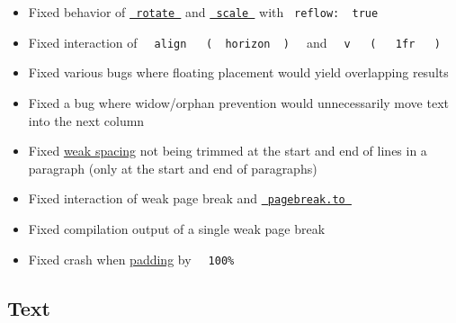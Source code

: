 \begin{itemize}
\item
  Fixed behavior of
  \href{/docs/reference/layout/rotate/}{\texttt{\ rotate\ }} and
  \href{/docs/reference/layout/scale/}{\texttt{\ scale\ }} with
  \texttt{\ reflow:\ }{\texttt{\ true\ }}\texttt{\ }
\item
  Fixed interaction of
  \texttt{\ }{\texttt{\ align\ }}\texttt{\ }{\texttt{\ (\ }}\texttt{\ horizon\ }{\texttt{\ )\ }}\texttt{\ }
  and
  \texttt{\ }{\texttt{\ v\ }}\texttt{\ }{\texttt{\ (\ }}\texttt{\ }{\texttt{\ 1fr\ }}\texttt{\ }{\texttt{\ )\ }}\texttt{\ }
\item
  Fixed various bugs where floating placement would yield overlapping
  results
\item
  Fixed a bug where widow/orphan prevention would unnecessarily move
  text into the next column
\item
  Fixed \href{/docs/reference/layout/h/\#parameters-weak}{weak spacing}
  not being trimmed at the start and end of lines in a paragraph (only
  at the start and end of paragraphs)
\item
  Fixed interaction of weak page break and
  \href{/docs/reference/layout/pagebreak/\#parameters-to}{\texttt{\ pagebreak.to\ }}
\item
  Fixed compilation output of a single weak page break
\item
  Fixed crash when \href{/docs/reference/layout/pad/}{padding} by
  \texttt{\ }{\texttt{\ 100\%\ }}\texttt{\ }
\end{itemize}

\subsection{Text}\label{text}

